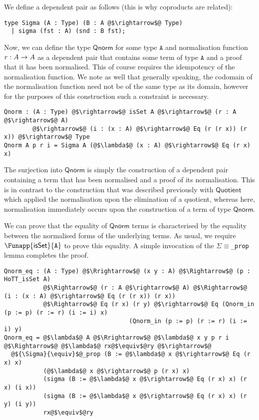 \documentclass[12pt,twoside,maitrise]{dms}
\theoremstyle{definition}
\numberwithin{equation}{section}
\numberwithin{table}{chapter}
\numberwithin{figure}{chapter}
\newcommand\kw[1] {\textsf{#1}}
\newcommand\id[1] {\texttt{#1}}
\newcommand\fn[1] {\texttt{#1}}
\begin{document}
We define a dependent pair as follows (this is why coproducts are related):

\begin{verbatim}
type Sigma (A : Type) (B : A @$\rightarrow$@ Type)
  | sigma (fst : A) (snd : B fst);
\end{verbatim}

Now, we can define the type $\kw{Qnorm}$ for some type $\id{A}$ and
normalisation function $\oftype{r}{A \rightarrow A}$ as a dependent pair that
contains some term of type $\id{A}$ and a proof that it has been normalised.
This of course requires the idempotency of the normalisation function. We note
as well that generally speaking, the codomain of the normalisation function need
not be of the same type as its domain, however for the purposes of this
construction such a constraint is necessary.

\begin{verbatim}
Qnorm : (A : Type) @$\rightarrow$@ isSet A @$\rightarrow$@ (r : A @$\rightarrow$@ A)
        @$\rightarrow$@ (i : (x : A) @$\rightarrow$@ Eq (r (r x)) (r x)) @$\rightarrow$@ Type
Qnorm A p r i = Sigma A (@$\lambda$@ (x : A) @$\rightarrow$@ Eq (r x) x)
\end{verbatim}

The surjection into $\kw{Qnorm}$ is simply the construction of a dependent pair
containing a term that has been normalised and a proof of its normalisation.
This is in contrast to the construction that was described previously with
$\kw{Quotient}$ which applied the normalisation upon the elimination of a
quotient, whereas here, normalisation immediately occurs upon the construction
of a term of type $\kw{Qnorm}$.

We can prove that the equality of $\kw{Qnorm}$ terms is characterised by the
equality between the normalised forms of the underlying terms. As usual, we
require $\Funapp{\kw{isSet}}{\id{A}}$ to prove this equality. A simple
invocation of the \fn{${\Sigma}{\equiv}$\_prop} lemma completes the proof.

\begin{verbatim}
Qnorm_eq : (A : Type) @$\Rrightarrow$@ (x y : A) @$\Rightarrow$@ (p : HoTT_isSet A)
           @$\Rightarrow$@ (r : A @$\rightarrow$@ A) @$\Rightarrow$@ (i : (x : A) @$\rightarrow$@ Eq (r (r x)) (r x))
           @$\Rightarrow$@ Eq (r x) (r y) @$\rightarrow$@ Eq (Qnorm_in (p := p) (r := r) (i := i) x)
                                   (Qnorm_in (p := p) (r := r) (i := i) y)
Qnorm_eq = @$\lambda$@ A @$\Rrightarrow$@ @$\lambda$@ x y p r i @$\Rightarrow$@ @$\lambda$@ rx@$\equiv$@ry @$\rightarrow$@
  @${\Sigma}{\equiv}$@_prop (B := @$\lambda$@ x @$\rightarrow$@ Eq (r x) x)
           (@$\lambda$@ x @$\rightarrow$@ p (r x) x)
           (sigma (B := @$\lambda$@ x @$\rightarrow$@ Eq (r x) x) (r x) (i x))
           (sigma (B := @$\lambda$@ x @$\rightarrow$@ Eq (r x) x) (r y) (i y))
           rx@$\equiv$@ry
\end{verbatim}
\end{document}
